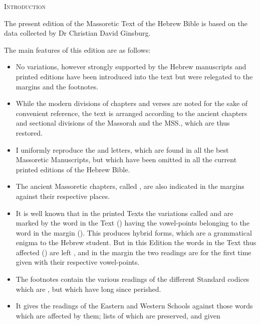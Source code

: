\thispagestyle{empty}

\begin{center}
\Large\scshape Introduction
\end{center}

\fontsize{12}{13}\selectfont

The present edition of the Massoretic Text of the Hebrew Bible is
based on the data collected by Dr Christian David Ginsburg.

The main features of this edition are as follows:
\begin{itemize}
\item No variations, however strongly supported by the Hebrew manuscripts
and printed editions have been introduced into
the text but were rele\-ga\-ted to the margins and the footnotes.
\item While the modern divisions of chapters and verses are noted for
the sake of convenient reference, the text is arranged according 
to the ancient chapters and sectional divisions of the Massorah
and the MSS., which are thus restored.
\item I uniformly reproduce the  and 
letters, which are found in all the best Massoretic Manuscripts, but which
have been omitted in all the current printed editions of the Hebrew Bible.
\item The ancient Massoretic chapters, called , are also
indicated in the margins against their respective places.
\item It is well known that in the printed Texts the variations called
 and  are marked by the word in the Text
() having the vowel-points belonging to the word in the
margin (). This produces hybrid forms, which are a grammatical
enigma to the Hebrew student. But in this Edition the words in the Text
thus affected () are left , and in
the margin the two readings are for the first time given with their
respective vowel-points.
\item The footnotes contain the various readings of the different Standard
codices which are , but which
have long since perished.
\item It gives the readings of the Eastern and Western Schools against those
words which are affected by them; lists of which are preserved, and given

\end{itemize}
